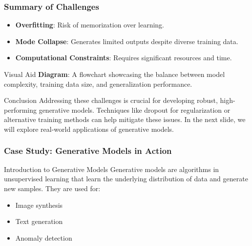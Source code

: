 \documentclass[aspectratio=169]{beamer}
\begin{document}
\begin{frame}[fragile]
  \frametitle{Summary of Challenges}
  
  \begin{itemize}
    \item \textbf{Overfitting}: Risk of memorization over learning.
    \item \textbf{Mode Collapse}: Generates limited outputs despite diverse training data.
    \item \textbf{Computational Constraints}: Requires significant resources and time.
  \end{itemize}
  
  \begin{block}{Visual Aid}
    \textbf{Diagram}: A flowchart showcasing the balance between model complexity, training data size, and generalization performance.
  \end{block}
  
  \begin{block}{Conclusion}
    Addressing these challenges is crucial for developing robust, high-performing generative models. Techniques like dropout for regularization or alternative training methods can help mitigate these issues. In the next slide, we will explore real-world applications of generative models.
  \end{block}
  
\end{frame}

\begin{frame}[fragile]
  \frametitle{Case Study: Generative Models in Action}
  \begin{block}{Introduction to Generative Models}
    Generative models are algorithms in unsupervised learning that learn the underlying distribution of data and generate new samples. They are used for:
    \begin{itemize}
      \item Image synthesis
      \item Text generation
      \item Anomaly detection
    \end{itemize}
  \end{block}
\end{frame}
\end{document}
